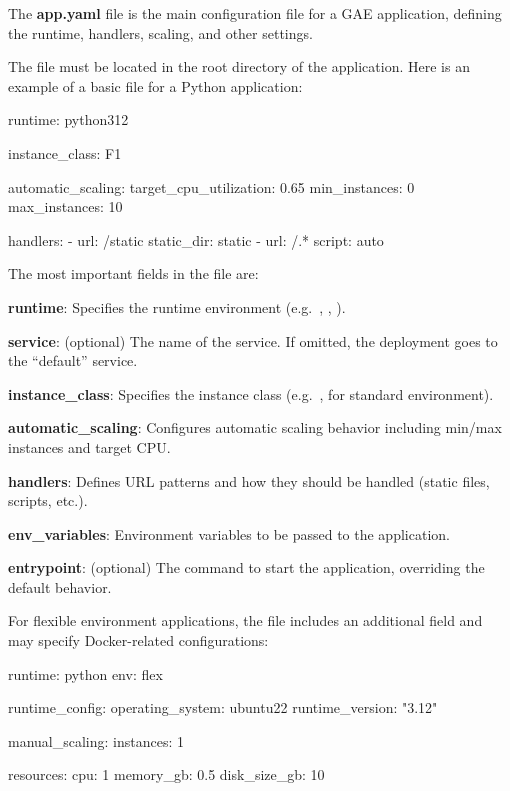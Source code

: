 The \textbf{app.yaml} file is the main configuration file for a GAE application, defining the runtime, handlers,
scaling, and other settings.
\ed

The  file must be located in the root directory of the application. Here is an example of a basic
 file for a Python application:
\begin{block}
runtime: python312

instance_class: F1

automatic_scaling:
  target_cpu_utilization: 0.65
  min_instances: 0
  max_instances: 10

handlers:
- url: /static
  static_dir: static
- url: /.*
  script: auto
\end{block}

The most important fields in the  file are:
\bit
\item \textbf{runtime}: Specifies the runtime environment (e.g.\ , , ).
\item \textbf{service}: (optional) The name of the service. If omitted, the deployment goes to the ``default'' service.
\item \textbf{instance\_class}: Specifies the instance class (e.g.\ ,  for standard environment).
\item \textbf{automatic\_scaling}: Configures automatic scaling behavior including min/max instances and target CPU\@.
\item \textbf{handlers}: Defines URL patterns and how they should be handled (static files, scripts, etc.).
\item \textbf{env\_variables}: Environment variables to be passed to the application.
\item \textbf{entrypoint}: (optional) The command to start the application, overriding the default behavior.
\eit

For flexible environment applications, the  file includes an additional  field and
may specify Docker-related configurations:
\begin{block}
runtime: python
env: flex

runtime_config:
  operating_system: ubuntu22
  runtime_version: "3.12"

manual_scaling:
  instances: 1

resources:
  cpu: 1
  memory_gb: 0.5
  disk_size_gb: 10
\end{block}

